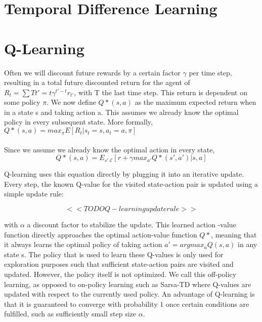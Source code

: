 \section{Temporal Difference Learning}

\section{Q-Learning}
Often we will discount future rewards
by a certain factor $\gamma$ per time step,
resulting in a total future discounted return
for the agent of
$R_t = \sum{T}{t'=t} \gamma^{t'-t}r_{t'}$,
with T the last time step.
This return is dependent on some policy $\pi$.
We now define $Q*(s,a)$ as the maximum expected return
when in a state s and taking action a.
This assumes we already know the optimal policy
in every subsequent state.
More formally,
$Q*(s,a) = max_{\pi}E[R_t|s_t=s, a_t=a, \pi]$

\paragraph{}
Since we assume we already know the optimal action in every state,
$$Q*(s,a) = E_{s'~\mathcal{E}}[r+\gamma max_{a'}Q*(s',a')|s,a]$$

Q-learning uses this equation directly
by plugging it into an iterative update.
Every step, the known Q-value for the visited state-action pair
is updated using a simple update rule:

$$<<TODO Q-learning update rule>>$$

with $\alpha$ a discount factor to stabilize the update.
This learned action	-value function directly approaches
the optimal action-value function $Q*$,
meaning that it always learns the optimal policy
of taking action $a' = argmax_{a}Q(s,a)$
in any state s.
The policy that is used to learn these Q-values
is only used for exploration purposes such that
sufficient state-action pairs are visited
and updated.
However, the policy itself is not optimized.
We call this off-policy learning,
as opposed to on-policy learning such as Sarsa-TD
where Q-values are updated with respect to
the currently used policy.
An advantage of Q-learning
is that it is guaranteed to converge
with probability 1
once certain conditions are fulfilled,
such as sufficiently small step size $\alpha$.

